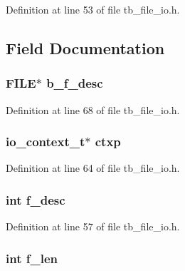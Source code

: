 Definition at line 53 of file tb\-\_\-file\-\_\-io.\-h.



\subsection{Field Documentation}
\hypertarget{structtb__file__t_a311cbc9163c962f6ed656f1a9b45c808}{
\subsubsection[{b\-\_\-f\-\_\-desc}]{\setlength{\rightskip}{0pt plus 5cm}F\-I\-L\-E$\ast$ b\-\_\-f\-\_\-desc}}\label{structtb__file__t_a311cbc9163c962f6ed656f1a9b45c808}


Definition at line 68 of file tb\-\_\-file\-\_\-io.\-h.

\hypertarget{structtb__file__t_ac4adc03fcdbc31dfd91163290186838c}{
\subsubsection[{ctxp}]{\setlength{\rightskip}{0pt plus 5cm}io\-\_\-context\-\_\-t$\ast$ ctxp}}\label{structtb__file__t_ac4adc03fcdbc31dfd91163290186838c}


Definition at line 64 of file tb\-\_\-file\-\_\-io.\-h.

\hypertarget{structtb__file__t_af6bfabeceb7d9e92a4a6d0f6ebdf3eec}{
\subsubsection[{f\-\_\-desc}]{\setlength{\rightskip}{0pt plus 5cm}int f\-\_\-desc}}\label{structtb__file__t_af6bfabeceb7d9e92a4a6d0f6ebdf3eec}


Definition at line 57 of file tb\-\_\-file\-\_\-io.\-h.

\hypertarget{structtb__file__t_a38103e9c674089353d1d072b3090d769}{
\subsubsection[{f\-\_\-len}]{\setlength{\rightskip}{0pt plus 5cm}int f\-\_\-len}}\label{structtb__file__t_a38103e9c674089353d1d072b3090d769}


